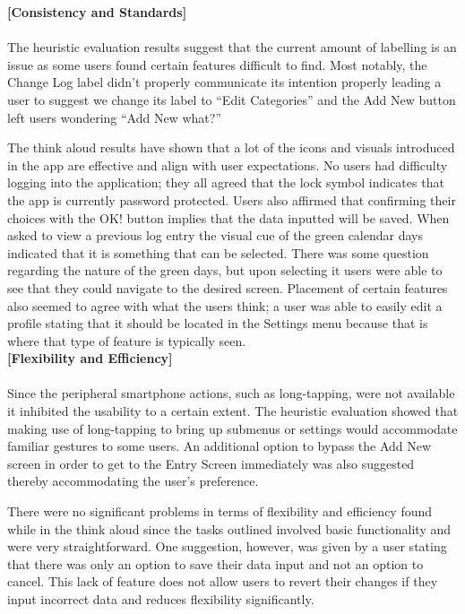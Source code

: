 \documentclass[pdftex,12pt,a4paper]{report}
\begin{document}
\noindent\textbf{[Consistency and Standards]}\\\\
The heuristic evaluation results suggest that the current amount of labelling is an issue as some users found certain features difficult to find. Most notably, the Change Log label didn't properly communicate its intention properly leading a user to suggest we change its label to ``Edit Categories'' and the Add New button left users wondering ``Add New what?''

The think aloud results have shown that a lot of the icons and visuals introduced in the app are effective and align with user expectations. No users had difficulty logging into the application; they all agreed that the lock symbol indicates that the app is currently password protected. Users also affirmed that confirming their choices with the OK! button implies that the data inputted will be saved. When asked to view a previous log entry the visual cue of the green calendar days indicated that it is something that can be selected. There was some question regarding the nature of the green days, but upon selecting it users were able to see that they could navigate to the desired screen. Placement of certain features also seemed to agree with what the users think; a user was able to easily edit a profile stating that it should be located in the Settings menu because that is where that type of feature is typically seen.\\

\noindent\textbf{[Flexibility and Efficiency]}\\\\
Since the peripheral smartphone actions, such as long-tapping, were not available it inhibited the usability to a certain extent. The heuristic evaluation showed that making use of long-tapping to bring up submenus or settings would accommodate familiar gestures to some users. An additional option to bypass the Add New screen in order to get to the Entry Screen immediately was also suggested thereby accommodating the user's preference.

There were no significant problems in terms of flexibility and efficiency found while in the think aloud since the tasks outlined involved basic functionality and were very straightforward. One suggestion, however, was given by a user stating that there was only an option to save their data input and not an option to cancel. This lack of feature does not allow users to revert their changes if they input incorrect data and reduces flexibility significantly.\\
\end{document}
